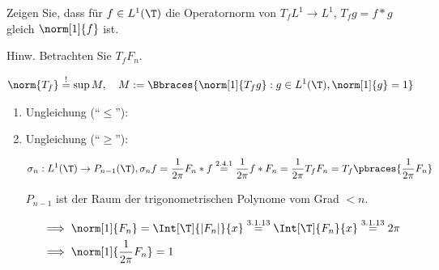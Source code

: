 
\begin{exercise}

Zeigen Sie, dass für $f \in L^1(\T)$ die Operatornorm von $T_f L^1 \to L^1$, $T_f g = f \ast g$ gleich $\norm[1]{f}$ ist.

Hinw.
Betrachten Sie $T_f F_n$.

\end{exercise}


\begin{solution}

\phantom{}

\begin{align*}
    \norm{T_f}
    \stackrel{!}{=}
    \sup M,
    \quad
    M
    :=
    \Bbraces
    {
        \norm[1]{T_f g}:
        g \in L^1(\T),
        \norm[1]{g} = 1
    }
\end{align*}

\begin{enumerate}[label = \arabic*.]

    \item Ungleichung (\enquote{$\leq$}):


    \item Ungleichung (\enquote{$\geq$}):
    

    \begin{align*}
        \sigma_n:
        L^1(\T) \to P_{n-1}(\T),
        \sigma_n f
        =
        \frac{1}{2 \pi}
        F_n \ast f
        \stackrel
        {
            \mathrm{2.4.1}
        }{=}
        \frac{1}{2 \pi}
        f \ast F_n
        =
        \frac{1}{2 \pi}
        T_f F_n
        =
        T_f
        \pbraces
        {
            \frac{1}{2 \pi}
            F_n
        }
    \end{align*}

    $P_{n-1}$ ist der Raum der trigonometrischen Polynome vom Grad $< n$.


    \begin{align*}
        & \implies
        \norm[1]{F_n}
        =
        \Int[\T]{|F_n|}{x}
        \stackrel
        {
            \mathrm{3.1.13}
        }{=}
        \Int[\T]{F_n}{x}        
        \stackrel
        {
            \mathrm{3.1.13}
        }{=}
        2 \pi \\
        & \implies
        \norm[1]
        {
            \frac{1}{2 \pi}
            F_n
        }
        =
        1
    \end{align*}
    

\end{enumerate}
\end{solution}
